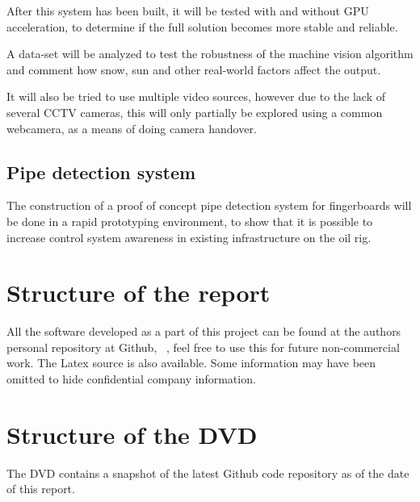 After this system has been built, it will be tested with and without GPU acceleration, to determine if the full solution becomes more stable and reliable.

A data-set will be analyzed to test the robustness of the machine vision algorithm and comment how snow, sun and other real-world factors affect the output.

It will also be tried to use multiple video sources, however due to the lack of several CCTV cameras, this will only partially be explored using a common webcamera, as a means of doing camera handover.

\subsection{Pipe detection system}
The construction of a proof of concept pipe detection system for fingerboards will be done in a rapid prototyping environment, to show that it is possible to increase control system awareness in existing infrastructure on the oil rig.

\section{Structure of the report}
All the software developed as a part of this project can be found at the authors personal repository at Github, ~\cite{github}, feel free to use this for future non-commercial work. The Latex source is also available. Some information may have been omitted to hide confidential company information.

\section{Structure of the DVD}
The DVD contains a snapshot of the latest Github code repository as of the date of this report.